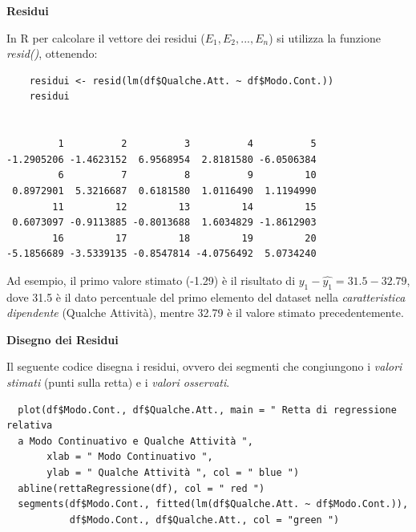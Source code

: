 \vspace{5mm}
\noindent \textbf{Residui}
\vspace{5mm}

In R per calcolare il vettore dei residui ($E_1, E_2, ..., E_n$) si utilizza la funzione \textit{resid()}, ottenendo:

\vspace{5mm}
\begin{lstlisting}
    residui <- resid(lm(df$Qualche.Att. ~ df$Modo.Cont.))
    residui


         1          2          3          4          5
-1.2905206 -1.4623152  6.9568954  2.8181580 -6.0506384
         6          7          8          9         10
 0.8972901  5.3216687  0.6181580  1.0116490  1.1194990
        11         12         13         14         15
 0.6073097 -0.9113885 -0.8013688  1.6034829 -1.8612903 
        16         17         18         19         20 
-5.1856689 -3.5339135 -0.8547814 -4.0756492  5.0734240
\end{lstlisting}
\vspace{5mm}

Ad esempio, il primo valore stimato (-1.29) è il risultato di $y_1 - \hat{y_1} = 31.5 - 32.79 $, dove 31.5 è il dato percentuale del primo elemento del dataset nella \textit{caratteristica dipendente} (Qualche Attività), mentre 32.79 è il valore stimato precedentemente.

\vspace{5mm}
\noindent \textbf{Disegno dei Residui}

Il seguente codice disegna i residui, ovvero dei segmenti che congiungono i \textit{valori stimati} (punti sulla retta) e i \textit{valori osservati}.

\vspace{5mm}
\begin{lstlisting}
  plot(df$Modo.Cont., df$Qualche.Att., main = " Retta di regressione relativa
  a Modo Continuativo e Qualche Attività ",
       xlab = " Modo Continuativo ",
       ylab = " Qualche Attività ", col = " blue ")
  abline(rettaRegressione(df), col = " red ")
  segments(df$Modo.Cont., fitted(lm(df$Qualche.Att. ~ df$Modo.Cont.)), 
           df$Modo.Cont., df$Qualche.Att., col = "green ")
\end{lstlisting}
\vspace{5mm}


